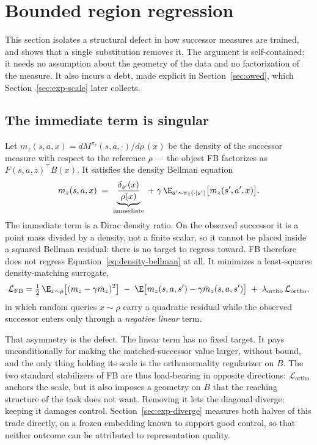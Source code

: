 \section{Bounded region regression}
\label{sec:method}

This section isolates a structural defect in how successor measures are trained,
and shows that a single substitution removes it. The argument is self-contained:
it needs no assumption about the geometry of the data and no factorization of the
measure. It also incurs a debt, made explicit in Section~\ref{sec:owed}, which
Section~\ref{sec:exp-scale} later collects.

\subsection{The immediate term is singular}
\label{sec:singular}

Let $m_z(s,a,x)=dM^{\pi_z}(s,a,\cdot)/d\rho\,(x)$ be the density of the successor
measure with respect to the reference $\rho$ --- the object FB factorizes as
$F(s,a,z)^{\top}B(x)$. It satisfies the density Bellman equation
\begin{equation}
\label{eq:density-bellman}
m_z(s,a,x)
\;=\;
\underbrace{\frac{\delta_{s'}(x)}{\rho(x)}}_{\text{immediate}}
\;+\;
\gamma\,\E_{a'\sim\pi_z(\cdot\mid s')}\big[m_z(s',a',x)\big].
\end{equation}
The immediate term is a Dirac density ratio. On the observed successor it is a
point mass divided by a density, not a finite scalar, so it cannot be placed
inside a squared Bellman residual: there is no target to regress toward. FB
therefore does not regress Equation~\ref{eq:density-bellman} at all. It minimizes
a least-squares density-matching surrogate,
\begin{equation}
\label{eq:fb-loss}
\mathcal{L}_{\mathrm{FB}}
=\tfrac12\,\E_{x\sim\rho}\big[(m_z-\gamma \bar m_z)^2\big]
\;-\;\E\big[m_z(s,a,s')-\gamma \bar m_z(s,a,s')\big]
\;+\;\lambda_{\mathrm{ortho}}\,\mathcal{L}_{\mathrm{ortho}},
\end{equation}
in which random queries $x\sim\rho$ carry a quadratic residual while the observed
successor enters only through a \emph{negative linear} term.

That asymmetry is the defect. The linear term has no fixed target. It pays
unconditionally for making the matched-successor value larger, without bound, and
the only thing holding its scale is the orthonormality regularizer on $B$. The two
standard stabilizers of FB are thus load-bearing in opposite directions:
$\mathcal{L}_{\mathrm{ortho}}$ anchors the scale, but it also imposes a geometry on
$B$ that the reaching structure of the task does not want. Removing it lets the
diagonal diverge; keeping it damages control. Section~\ref{sec:exp-diverge}
measures both halves of this trade directly, on a frozen embedding known to
support good control, so that neither outcome can be attributed to representation
quality.

